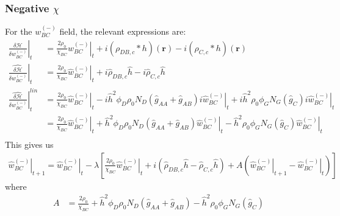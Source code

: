 \documentclass{article}
\begin{document}
    \subsubsection{Negative $\chi$}
  For the $w_{BC}^{(-)}$ field, the relevant expressions are:
  \begin{align*}
    \left. \frac{\delta \mathcal{H}}{\delta w_{BC}^{(-)}} \right|_t &=
      \frac{2 \rho_0}{\chi_{BC}} \left. w_{BC}^{(-)} \right|_t
      +i (\rho_{DB,c} \ast h)(\mathbf{r})
      -i (\rho_{C,c} \ast h)(\mathbf{r}) \\
    \left. \hat{\frac{\delta \mathcal{H}}{\delta w_{BC}^{(-)}}} \right|_t &=
      \frac{2 \rho_0}{\chi_{BC}} \left. \hat{w}_{BC}^{(-)} \right|_t
      +i \hat{\rho}_{DB,c} \hat{h}
      -i \hat{\rho}_{C,c} \hat{h} \\
    \left.
      \hat{\frac{\delta \mathcal{H}}{\delta w_{BC}^{(-)}}}
    \right| ^{lin}_t &=
    \frac{2\rho_0}{\chi_{BC}} \left. \hat{w}_{BC}^{(-)} \right|_t
      - i \hat{h}^2 \phi_D \rho_0 N_D
        (\hat{g}_{AA} + \hat{g}_{AB}) i \left.
          \hat{w}_{BC}^{(-)} \right|_t 
          + i \hat{h} ^2  {\rho}_0  
          \left. \phi_G N_G (\hat{g}_{C}) i \hat{w}_{BC}^{(-)} \right|_t
          \\
    &= \frac{2\rho_0}{\chi_{BC}} \left. \hat{w}_{BC}^{(-)} \right|_t
      + \hat{h}^2 \phi_D \rho_0 N_D
        (\hat{g}_{AA} + \hat{g}_{AB})
          \left. \hat{w}_{BC}^{(-)} \right|_t
          -  \hat{h} ^2  {\rho}_0  
          \left. \phi_G N_G (\hat{g}_{C})  \hat{w}_{BC}^{(-)} \right|_t
          \\
  \end{align*}
  This gives us
  \begin{align*}
    \left. \hat{w}_{BC}^{(-)} \right|_{t+1} =
      \left. \hat{w}_{BC}^{(-)} \right|_t - \lambda \left[
        \frac{2\rho_0}{\chi_{BC}} \left. \hat{w}_{BC}^{(-)} \right|_t
        + i ( \hat{\rho}_{DB,c} \hat{h}
              - \hat{\rho}_{C,c} \hat{h} )
        + A ( \left. \hat{w}_{BC}^{(-)} \right|_{t+1}
              - \left. \hat{w}_{BC}^{(-)} \right|_t)
      \right]
  \end{align*}
  where
  \begin{align*}
    A &=
    \frac{2\rho_0}{\chi_{BC}} 
      + \hat{h}^2 \phi_D \rho_0 N_D
        (\hat{g}_{AA} + \hat{g}_{AB})
        -  \hat{h} ^2  {\rho}_0  
          \phi_G N_G (\hat{g}_{C}) 
  \end{align*}
\end{document}
